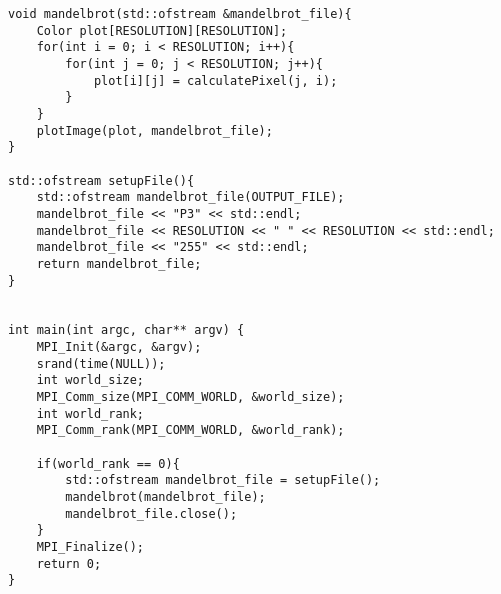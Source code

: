 \documentclass[12pt]{article}
\begin{document}
\begin{verbatim}
void mandelbrot(std::ofstream &mandelbrot_file){
	Color plot[RESOLUTION][RESOLUTION];
	for(int i = 0; i < RESOLUTION; i++){
		for(int j = 0; j < RESOLUTION; j++){
			plot[i][j] = calculatePixel(j, i);
		}
	}
	plotImage(plot, mandelbrot_file);
}

std::ofstream setupFile(){
	std::ofstream mandelbrot_file(OUTPUT_FILE);
	mandelbrot_file << "P3" << std::endl;
	mandelbrot_file << RESOLUTION << " " << RESOLUTION << std::endl;
	mandelbrot_file << "255" << std::endl;
	return mandelbrot_file;
}


int main(int argc, char** argv) {
	MPI_Init(&argc, &argv);
	srand(time(NULL));
	int world_size;
	MPI_Comm_size(MPI_COMM_WORLD, &world_size);
	int world_rank;
	MPI_Comm_rank(MPI_COMM_WORLD, &world_rank);

	if(world_rank == 0){
		std::ofstream mandelbrot_file = setupFile();
		mandelbrot(mandelbrot_file);
		mandelbrot_file.close();
	}
	MPI_Finalize();
	return 0;
}


\end{verbatim}
\end{document}
